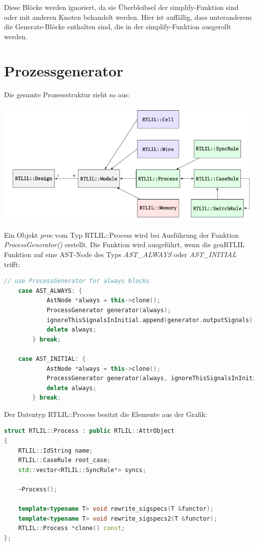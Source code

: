 \documentclass[11pt]{report}
\begin{document}
Diese Blöcke werden ignoriert, da sie Überbleibsel der simplify-Funktion sind oder mit anderen Knoten behandelt werden. Hier ist auffällig, dass unteranderem die Generate-Blöcke enthalten sind, die in der simplify-Funktion ausgerollt werden.

\section{Prozessgenerator}
Die gesamte Prozessstruktur sieht so aus:
\begin{center}
\includegraphics[scale=0.5]{process.png}
\end{center}
Ein Objekt \textit{proc} vom Typ RTLIL::Process wird bei Ausführung der Funktion \textit{ProcessGenerator()} erstellt.
Die Funktion wird ausgeführt, wenn die genRTLIL Funktion auf eine AST-Node des Typs \textit{AST\_ALWAYS} oder \textit{AST\_INITIAL} trifft:
\begin{lstlisting}[language=C++]
	// use ProcessGenerator for always blocks
	case AST_ALWAYS: {
			AstNode *always = this->clone();
			ProcessGenerator generator(always);
			ignoreThisSignalsInInitial.append(generator.outputSignals);
			delete always;
		} break;

	case AST_INITIAL: {
			AstNode *always = this->clone();
			ProcessGenerator generator(always, ignoreThisSignalsInInitial);
			delete always;
		} break;
\end{lstlisting}
Der Datentyp RTLIL::Process besitzt die Elemente aus der Grafik:
\begin{lstlisting}[language=C++]
struct RTLIL::Process : public RTLIL::AttrObject
{
	RTLIL::IdString name;
	RTLIL::CaseRule root_case;
	std::vector<RTLIL::SyncRule*> syncs;

	~Process();

	template<typename T> void rewrite_sigspecs(T &functor);
	template<typename T> void rewrite_sigspecs2(T &functor);
	RTLIL::Process *clone() const;
};
\end{lstlisting}
\end{document}
